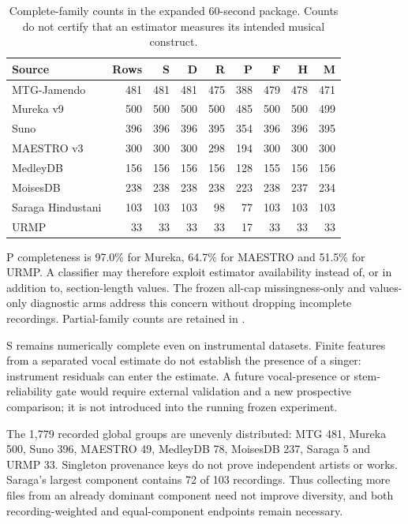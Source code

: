 \documentclass[11pt,a4paper]{article}
\begin{document}
\begin{table}[htbp]
\centering\small
\begin{tabular}{lrrrrrrrr}
\toprule
Source & Rows & S & D & R & P & F & H & M \\
\midrule
MTG-Jamendo & 481 & 481 & 481 & 475 & 388 & 479 & 478 & 471 \\
Mureka v9 & 500 & 500 & 500 & 500 & 485 & 500 & 500 & 499 \\
Suno & 396 & 396 & 396 & 395 & 354 & 396 & 396 & 395 \\
MAESTRO v3 & 300 & 300 & 300 & 298 & 194 & 300 & 300 & 300 \\
MedleyDB & 156 & 156 & 156 & 156 & 128 & 155 & 156 & 156 \\
MoisesDB & 238 & 238 & 238 & 238 & 223 & 238 & 237 & 234 \\
Saraga Hindustani & 103 & 103 & 103 & 98 & 77 & 103 & 103 & 103 \\
URMP & 33 & 33 & 33 & 33 & 17 & 33 & 33 & 33 \\
\bottomrule
\end{tabular}
\caption{Complete-family counts in the expanded 60-second package. Counts do
not certify that an estimator measures its intended musical construct.}
\end{table}

P completeness is 97.0\% for Mureka, 64.7\% for MAESTRO and 51.5\% for URMP.
A classifier may therefore exploit estimator availability instead of, or in
addition to, section-length values. The frozen all-cap missingness-only and
values-only diagnostic arms address this concern without dropping incomplete
recordings. Partial-family counts are retained in
.

S remains numerically complete even on instrumental datasets. Finite features
from a separated vocal estimate do not establish the presence of a singer:
instrument residuals can enter the estimate. A future vocal-presence or
stem-reliability gate would require external validation and a new prospective
comparison; it is not introduced into the running frozen experiment.

The 1,779 recorded global groups are unevenly distributed: MTG 481, Mureka 500,
Suno 396, MAESTRO 49, MedleyDB 78, MoisesDB 237, Saraga 5 and URMP 33.
Singleton provenance keys do not prove independent artists or works. Saraga's
largest component contains 72 of 103 recordings. Thus collecting more files
from an already dominant component need not improve diversity, and both
recording-weighted and equal-component endpoints remain necessary.
\end{document}
